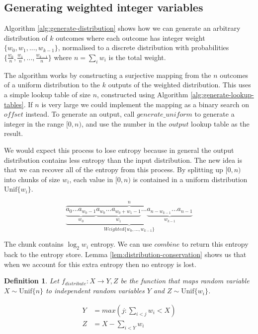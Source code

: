 \documentclass[12pt]{article}
\newtheorem{definition}{Definition}
\newcommand{\unif}[1]{\mathrm{Unif}\{#1\}}
\begin{document}
\subsection{Generating weighted integer variables}

Algorithm \ref{alg:generate-distribution} shows how we can generate an arbitrary  distribution of $k$ outcomes where each outcome has integer weight $\{w_0, w_1, ..., w_{k-1}\}$, normalised to a discrete distribution with probabilities $\{\frac{w_0}{n}, \frac{w_1}{n}, ..., \frac{w_{k-1}}{n}\}$ where $n=\sum_i w_i$ is the total weight.

The algorithm works by constructing a surjective mapping from the $n$ outcomes of a uniform distribution to the $k$ outputs of the weighted distribution. This uses a simple lookup table of size $n$, constructed using Algorithm \ref{alg:generate-lookup-tables}. If $n$ is very large we could implement the mapping as a binary search on $offset$ instead. To generate an output, call $generate\_uniform$ to generate a integer in the range $[0,n)$, and use the number in the $output$ lookup table as the result. 

We would expect this process to lose entropy because in general the output distribution contains less entropy than the input distribution. The new idea is that we can recover all of the entropy from this process. By splitting up $[0,n)$ into chunks of size $w_i$, each value in $[0,n)$ is contained in a uniform distribution $\unif{w_i}$.

\[
\overbrace{
    \underbrace{
        \underbrace{a_0 ... a_{w_0-1}}_{w_0}
          \underbrace{a_{w_0} ... a_{w_0+w_1-1}}_{w_1}
          ...
          \underbrace{
             a_{n-w_{k-1}} ... 
             a_{n-1}
         }_{w_{k-1}}
    }_{Weighted\{w_0, ..., w_{k-1}\}}
}^{n}
\]

The chunk contains $\log_2w_i$ entropy. We can use $combine$ to return this entropy back to the entropy store. Lemma \ref{lem:distribution-conservation} shows us that when we account for this extra entropy then no entropy is lost.



\begin{definition}
    Let $f_{distribute}: X \rightarrow Y, Z$ be the function that maps random variable $X \sim \unif{n}$ to independent random variables $Y$ and $Z \sim \unif{w_i}$.

    \begin{align}
    Y &= max(j : \sum_{i<j}w_i<X) \\
    Z &= X - \sum_{i<Y}w_i
    \end{align}

\end{definition}
\end{document}
